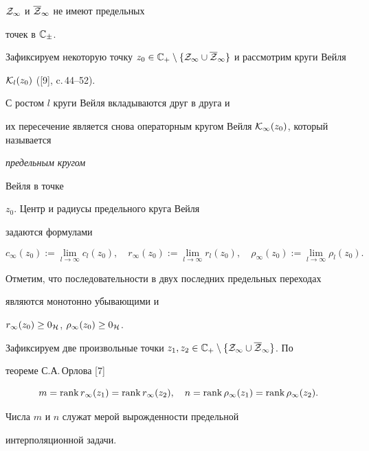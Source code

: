 ${\cal Z}_{\infty }$ и $\overline {\cal Z}_{\infty }$ не имеют предельных


точек в ${\Bbb C}_{\pm}$.





Зафиксируем некоторую точку $z_0 \in {\Bbb C}_+\setminus \{{\cal Z}_{\infty }


\cup \overline {\cal Z}_{\infty }\}$ и рассмотрим круги Вейля


${\cal K}_l(z_0)$ ([9], c.\,44--52).


С ростом $l$ круги Вейля вкладываются друг в друга и


их пересечение является снова операторным кругом Вейля ${\cal


K}_{\infty }(z_0)$, который называется {\em предельным кругом


Вейля в точке} $z_0$. Центр и радиусы предельного круга Вейля


задаются формулами


$$


c_{\infty }(z_0):=\lim _{l\to \infty } c_l (z_0),\quad


r_ {\infty }(z_0):=\lim _{l\to \infty} r_l (z_0),\quad


\rho_ {\infty }(z_0):=\lim _{l\to \infty} \rho _l (z_0).


$$


Отметим, что последовательности в двух последних предельных переходах


являются монотонно убывающими и


$r_ {\infty }(z_0)\geq 0_{\cal H}$, $\rho_{\infty }(z_0)\geq 0_{\cal H}$.





Зафиксируем две произвольные точки $z_1,z_2\in {\Bbb C}_+\setminus


\{{\cal Z}_{\infty } \cup \overline {\cal Z}_{\infty }\} $. По


теореме С.А.\,Орлова [7]


$$


m=\rank r_ {\infty }(z_1)=\rank r_ {\infty }(z_2),\quad


n=\rank\rho_ {\infty }(z_1)=\rank \rho_ {\infty }(z_2).


$$


Числа $m$ и $n$ служат мерой вырожденности предельной


интерполяционной задачи.





